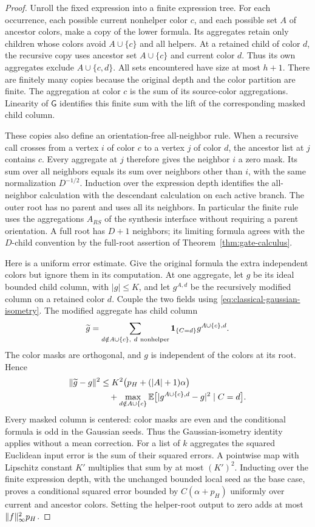 \begin{proof}
Unroll the fixed expression into a finite expression tree.  For
each occurrence, each possible current nonhelper color $c$, and each
possible set $A$ of ancestor colors, make a copy of the lower
formula.  Its aggregates retain only children whose colors avoid
$A\cup\{c\}$ and all helpers.  At a retained child of color $d$,
the recursive copy uses ancestor set $A\cup\{c\}$ and current color
$d$.  Thus its own aggregates exclude $A\cup\{c,d\}$.  All sets
encountered have size at most $h+1$.  There are finitely many copies
because the original depth and the color partition are finite.
The aggregation at color $c$ is the sum of its source-color
aggregations.  Linearity of $\mathsf G$ identifies this finite sum
with the lift of the corresponding masked child column.

These copies also define an orientation-free all-neighbor rule.
When a recursive call crosses from a vertex $i$ of color $c$ to a
vertex $j$ of color $d$, the ancestor list at $j$ contains $c$.
Every aggregate at $j$ therefore gives the neighbor $i$ a zero
mask. Its sum over all neighbors equals its sum over neighbors other
than $i$, with the same normalization $D^{-1/2}$. Induction over the
expression depth identifies the all-neighbor calculation with the
descendant calculation on each active branch. The outer root has no
parent and uses all its neighbors. In particular the finite rule uses
the aggregations $A_{RS}$ of the synthesis interface without requiring
a parent orientation. A full root has $D+1$ neighbors; its limiting
formula agrees with the $D$-child convention by the full-root assertion
of Theorem~\ref{thm:gate-calculus}.

Here is a uniform error estimate.  Give the original formula the
extra independent colors but ignore them in its computation.
At one aggregate, let $g$ be its ideal bounded child column, with
$|g|\le K$, and let $g^{A,d}$ be the recursively modified column on
a retained color $d$.  Couple the two fields using
\eqref{eq:classical-gaussian-isometry}.  The modified aggregate has
child column
\[
 \widetilde g
 =\sum_{d\notin A\cup\{c\},\ d\ {\mathrm{nonhelper}}}
            \mathbf 1_{\{C=d\}}g^{A\cup\{c\},d}.
\]
The color masks are orthogonal, and $g$ is independent of the colors
at its root.  Hence
\begin{align*}
 \lVert \widetilde g-g\rVert^2
 &\le K^2\bigl(p_H+(|A|+1)\alpha\bigr)\\
 &\quad+\max_{d\notin A\cup\{c\}}
       \mathbb E\bigl[|g^{A\cup\{c\},d}-g|^2\mid C=d\bigr].
\end{align*}
Every masked column is centered: color masks are even and the
conditional formula is odd in the Gaussian seeds.  Thus the
Gaussian-isometry identity applies without a mean correction.
For a list of $k$ aggregates the squared Euclidean input error is
the sum of their squared errors.  A pointwise map with Lipschitz
constant $K'$ multiplies that sum by at most $(K')^2$.
Inducting over the finite expression depth, with the unchanged
bounded local seed as the base case, proves a conditional squared
error bounded by $C(\alpha+p_H)$ uniformly over current and
ancestor colors.  Setting the helper-root output to zero adds at
most $\lVert f\rVert_\infty^2p_H$.


\end{proof}
